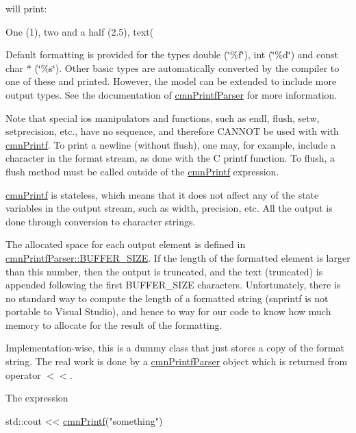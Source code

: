 will print\+:

\begin{DoxyVerb}One (1), two and a half (2.5), text(
\end{DoxyVerb}


Default formatting is provided for the types double (\char`\"{}\%f\char`\"{}), int (\char`\"{}\%d\char`\"{}) and const char $\ast$ (\char`\"{}\%s\char`\"{}). Other basic types are automatically converted by the compiler to one of these and printed. However, the model can be extended to include more output types. See the documentation of \hyperlink{classcmn_printf_parser}{cmn\+Printf\+Parser} for more information.

Note that special ios manipulators and functions, such as endl, flush, setw, setprecision, etc., have no \textquotesingle{}\textquotesingle{} sequence, and therefore C\+A\+N\+N\+O\+T be used with with \hyperlink{classcmn_printf}{cmn\+Printf}. To print a newline (without flush), one may, for example, include a \textquotesingle{}~\newline
\textquotesingle{} character in the format stream, as done with the C printf function. To flush, a flush method must be called outside of the \hyperlink{classcmn_printf}{cmn\+Printf} expression.

\hyperlink{classcmn_printf}{cmn\+Printf} is stateless, which means that it does not affect any of the state variables in the output stream, such as width, precision, etc. All the output is done through conversion to character strings.

The allocated space for each output element is defined in {\ttfamily \hyperlink{group__cisst_common_gga2dbb69cb7aa030799fad9b8d7a1857d5af9f1fd3238867d902ee69418278958a9}{cmn\+Printf\+Parser\+::\+B\+U\+F\+F\+E\+R\+\_\+\+S\+I\+Z\+E}}. If the length of the formatted element is larger than this number, then the output is truncated, and the text \textquotesingle{}(truncated)\textquotesingle{} is appended following the first B\+U\+F\+F\+E\+R\+\_\+\+S\+I\+Z\+E characters. Unfortunately, there is no standard way to compute the length of a formatted string (snprintf is not portable to Visual Studio), and hence to way for our code to know how much memory to allocate for the result of the formatting.

Implementation-\/wise, this is a dummy class that just stores a copy of the format string. The real work is done by a \hyperlink{classcmn_printf_parser}{cmn\+Printf\+Parser} object which is returned from operator $<$$<$.

The expression 
\begin{DoxyCode}
std::cout << \hyperlink{classcmn_printf_af834e91520896f203bf74171a852e38f}{cmnPrintf}(\textcolor{stringliteral}{"something"})
\end{DoxyCode}


